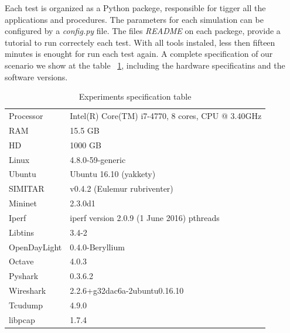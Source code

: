 Each test is organized as a Python packege, responsible for tigger all the applications and procedures. The parameters for each simulation can be configured by a \textit{config.py} file. The files \textit{README} on each packege, provide a tutorial to run correctely each test. With all tools instaled, less then fifteen minutes is enought for run each test again. A complete specification of our scenario we show at the table ~\ref{tab:specifications}, including the hardware specificatins and the software versions. 

\begin{table}[ht!]
	\centering
	\caption{Experiments specification table}
	\label{tab:specifications}
	\begin{tabular}{ll}
		\hline
		Processor            & Intel(R) Core(TM) i7-4770, 8 cores, CPU @ 3.40GHz \\
		RAM                  & 15.5 GB                                           \\
		HD                   & 1000 GB                                           \\
		Linux         & 4.8.0-59-generic                                  \\
		Ubuntu        & Ubuntu 16.10 (yakkety)                            \\
		SIMITAR       & v0.4.2 (Eulemur rubriventer)                      \\
		Mininet       & 2.3.0d1                                           \\
		Iperf         & iperf version 2.0.9 (1 June 2016) pthreads        \\
		Libtins       & 3.4-2                                             \\
		OpenDayLight  & 0.4.0-Beryllium                                   \\
		Octave        & 4.0.3                                             \\
		Pyshark       & 0.3.6.2                                     \\
		Wireshark     & 2.2.6+g32dac6a-2ubuntu0.16.10               \\
		Tcudump       & 4.9.0 \\
		libpcap       & 1.7.4\\
		\hline
	\end{tabular}
\end{table}


